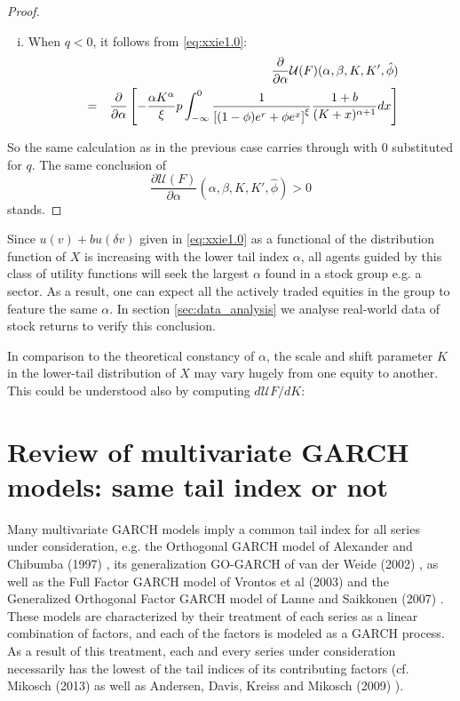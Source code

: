 \documentclass{article}
\newcommand{\pd}[2]{
  \frac{\partial #1}{\partial #2}
}
\newcommand{\opd}[1]{
  \frac{\partial}{\partial #1}
}
\newcommand{\1}[1]{
  \mathbf{1}_{\{#1\}}
}
\begin{document}
\begin{proof}
\begin{enumerate}[i.]
  \item When $q < 0$, it follows from \eqref{eq:xxie1.0}:
    \begin{eqnarray*}
      && \opd{\alpha}\mathcal U(F)(\alpha, \beta, K, K', \hat\phi) \\
      &=& \opd{\alpha} \left[
        -{\alpha K^\alpha \over \xi} p
        \int_{-\infty}^0
            {
              1 \over \left[ (1 - \phi) e^r + \phi e^x \right]^{\xi}
            }
            {1 + b \over (K + x)^{\alpha + 1}} dx
        \right]
    \end{eqnarray*}
  \end{enumerate}
  So the same calculation as in the previous case carries through
  with 0 substituted for $q$. The same conclusion of
  \[
  \pd{\mathcal U(F)}{\alpha}(\alpha, \beta, K, K', \hat \phi) > 0
  \]
  stands.
\end{proof}
Since $u(v) + b u(\delta v)$ given in \eqref{eq:xxie1.0} as a
functional of the distribution function of $X$ is increasing with the
lower tail index $\alpha$, all agents guided by this class of utility
functions will seek the largest $\alpha$ found in a stock group e.g.
a sector. As a result, one can expect all the actively traded equities
in the group to feature the same $\alpha$. In section
\ref{sec:data_analysis} we analyse real-world data of stock returns to
verify this conclusion.

In comparison to the theoretical constancy of $\alpha$, the scale and
shift parameter $K$ in the lower-tail distribution of $X$ may vary
hugely from one equity to another. This could be understood also by
computing $d\mathcal U F / dK$:

\section{Review of multivariate GARCH models:
  same tail index or not}
Many multivariate GARCH models imply a common tail index for all
series under consideration, e.g. the Orthogonal GARCH model of
Alexander and Chibumba (1997) \cite{alexander1997multivariate}, its
generalization GO-GARCH of van der Weide (2002) \cite{van2002go}, as
well as the Full Factor GARCH model of Vrontos et al (2003)
\cite{vrontos2003full} and the Generalized Orthogonal Factor GARCH
model of Lanne and Saikkonen (2007) \cite{lanne2007modeling}. These
models are characterized by their treatment of each series as a linear
combination of factors, and each of the factors is modeled as a GARCH
process. As a result of this treatment, each and every series under
consideration necessarily has the lowest of the tail indices of its
contributing factors (cf. Mikosch (2013) \cite{Mikosch2013} as well
as Andersen, Davis, Kreiss and Mikosch (2009)
\cite{andersen2009handbook}).
\end{document}
